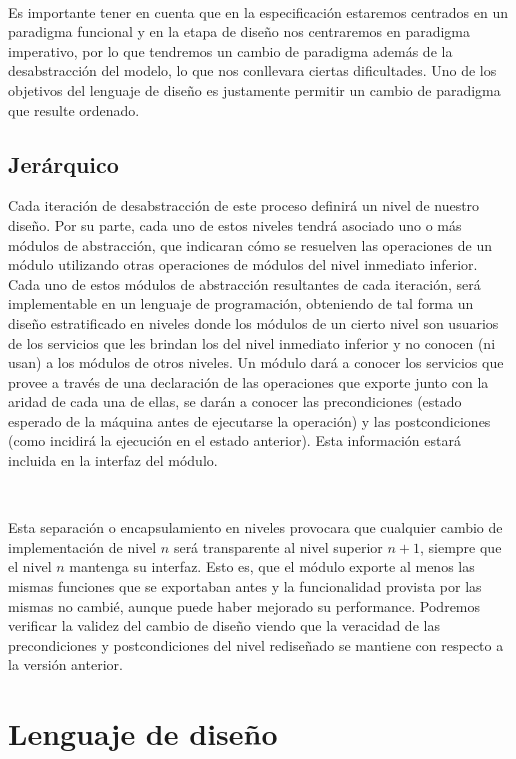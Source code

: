 ~

Es importante tener en cuenta que en la especificaci\'on estaremos centrados en un paradigma funcional y en la etapa de dise\~no nos centraremos en paradigma imperativo, por lo que tendremos un cambio de paradigma adem\'as de la desabstracci\'on del modelo, lo que nos conllevara ciertas dificultades. Uno de los objetivos del lenguaje de dise\~no es justamente permitir un cambio de paradigma que resulte ordenado.

\subsection{Jer\'arquico}

Cada iteraci\'on de desabstracci\'on de este proceso definir\'a un nivel de nuestro dise\~no. Por su parte, cada uno de estos niveles tendr\'a asociado uno o m\'as m\'odulos de abstracci\'on, que indicaran c\'omo se resuelven las operaciones de un m\'odulo utilizando otras operaciones de m\'odulos del nivel inmediato inferior. Cada uno de estos m\'odulos de abstracci\'on resultantes de cada iteraci\'on, ser\'a implementable en un lenguaje de programaci\'on, obteniendo de tal forma un dise\~no estratificado en niveles donde los m\'odulos de un cierto nivel son usuarios de los servicios que les brindan los del nivel inmediato inferior y no conocen (ni usan) a los m\'odulos de otros niveles. Un m\'odulo dar\'a a conocer los servicios que provee a trav\'es de una declaraci\'on de las operaciones que exporte junto con la aridad de cada una de ellas, se dar\'an a conocer las precondiciones (estado esperado de la m\'aquina antes de ejecutarse la operaci\'on) y las postcondiciones (como incidir\'a la ejecuci\'on en 
el estado anterior). Esta informaci\'on estar\'a incluida en la interfaz del m\'odulo.

~

Esta separaci\'on o encapsulamiento en niveles provocara que cualquier cambio de implementaci\'on de nivel $n$ ser\'a transparente al nivel superior $n+1$, siempre que el nivel $n$ mantenga su interfaz. Esto es, que el m\'odulo exporte al menos las mismas funciones que se exportaban antes y la funcionalidad provista por las mismas no cambi\'e, aunque puede haber mejorado su performance. Podremos verificar la validez del cambio de dise\~no viendo que la veracidad de las precondiciones y postcondiciones del nivel redise\~nado se mantiene con respecto a la versi\'on anterior.

\section{Lenguaje de dise\~no}

